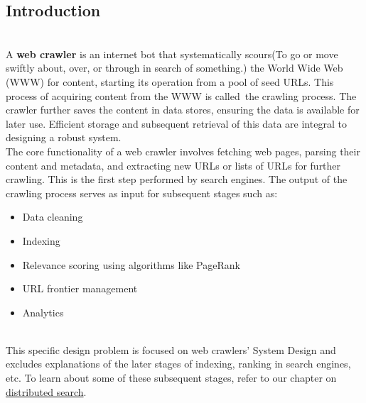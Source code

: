 

\subsection{Introduction}\label{S7jXFe80tYndqj-0wwhlE}
\\
A \textbf{web crawler} is an internet bot that systematically scours(To go or move swiftly about, over, or through in search of something.) the World Wide Web (WWW) for content, starting its operation from a pool of seed URLs. This process of acquiring content from the WWW is called~the crawling process. The crawler further saves the content in data stores, ensuring the data is available for later use. Efficient storage and subsequent retrieval of this data are integral to designing a robust system.
\\
The core functionality of a web crawler involves fetching web pages, parsing their content and metadata, and extracting new URLs or lists of URLs for further crawling. This is the first step performed by search engines. The output of the crawling process serves as input for subsequent stages such as:

\begin{itemize}
\item
\protect{}\label{n-ma5kx29dzHOjLjcEz4W}
Data cleaning
\item
\protect{}\label{d0eeGRL2E-e6YqML2nZrV}
Indexing
\item
\protect{}\label{eezIXGbCFJu6sS8WPi7Rn}
Relevance scoring using algorithms like PageRank
\item
\protect{}\label{2WmEGGXxo9-KvUy88AcOF}
URL frontier management
\item
\protect{}\label{kTmutk9s9KAAAfoNNc3Kq}
Analytics
\end{itemize}
\\
This specific design problem is focused on web crawlers' System Design and excludes explanations of the later stages of indexing, ranking in search engines, etc. To learn about some of these subsequent stages, refer to our chapter on \href{https://www.educative.io/courses/grokking-the-system-design-interview/system-design-the-distributed-search}{distributed search}.

